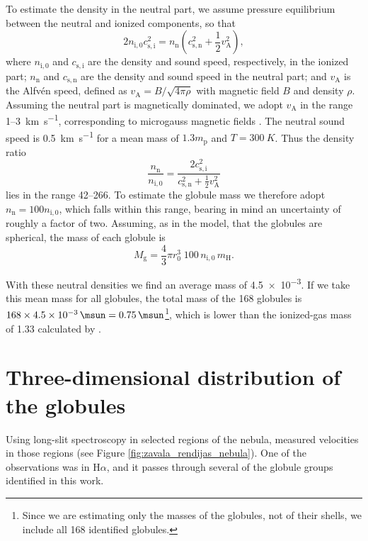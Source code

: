\documentclass{book}
\begin{document}
To estimate the density in the neutral part, we assume pressure
equilibrium between the neutral and ionized components, so that
\begin{equation}
    2 n_\mathrm{i,0}c_\mathrm{s,i}^2 =
    n_\mathrm{n}\!\left(c_\mathrm{s,n}^2+\frac{1}{2}v_\mathrm{A}^2\right),
\end{equation}
where $n_\mathrm{i,0}$ and $c_\mathrm{s,i}$ are the density and sound
speed, respectively, in the ionized part; $n_\mathrm{n}$ and
$c_\mathrm{s,n}$ are the density and sound speed in the neutral part;
and $v_\mathrm{A}$ is the Alfvén speed, defined as
$v_\mathrm{A}=B/\sqrt{4\pi \rho}$ with magnetic field $B$ and density
$\rho$. Assuming the neutral part is magnetically dominated, we adopt
$v_\mathrm{A}$ in the range 1--\SI{3}{km.s^{-1}}, corresponding to
microgauss magnetic fields \citep{Bertoldi_1989}. The neutral sound
speed is \SI{0.5}{km.s^{-1}} for a mean mass of $1.3m_\mathrm{p}$ and
$T=\SI{300}{K}$. Thus the density ratio
\begin{equation}
    \frac{n_\mathrm{n}}{n_\mathrm{i,0}}=
    \frac{2c_\mathrm{s,i}^2}{c_\mathrm{s,n}^2+\frac{1}{2}v_\mathrm{A}^2}
\end{equation}
lies in the range 42--266. To estimate the globule mass we therefore
adopt $n_\mathrm{n}=100n_\mathrm{i,0}$, which falls within this range,
bearing in mind an uncertainty of roughly a factor of two. Assuming,
as in the model, that the globules are spherical, the mass of each
globule is
\begin{equation}
    M_\mathrm{g} = \frac{4}{3}\pi r_0^3 \; 100\,n_\mathrm{i,0}\, m_\mathrm{H}.
\end{equation}

With these neutral densities we find an average mass of
\SI{4.5e-3}{\msun}. If we take this mean mass for all globules, the
total mass of the 168 globules is
$168\times\SI{4.5e-3}{\msun}=\SI{0.75}{\msun}$\footnote{Since we are
  estimating only the masses of the globules, not of their shells, we
  include all 168 identified globules.}, which is lower than the
ionized-gas mass of \SI{1.33}{\msun} calculated by
\cite{Grosdidier:1998}.


\section{Three-dimensional distribution of the globules}
\label{sec: distrtibucion}

Using long-slit spectroscopy in selected regions of the nebula,
\cite{Zavala:2022} measured velocities in those regions (see Figure
\ref{fig:zavala_rendijas_nebula}). One of the observations was in
H$\alpha$, and it passes through several of the globule groups
identified in this work.
\end{document}

